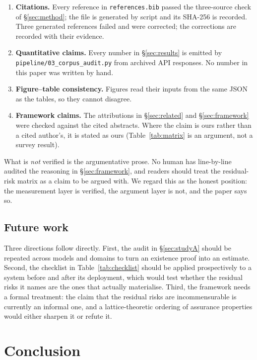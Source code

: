 \documentclass[11pt,a4paper]{article}
\begin{document}
\begin{enumerate}[leftmargin=*,itemsep=2pt]
  \item \textbf{Citations.} Every reference in \texttt{references.bib} passed
  the three-source check of \S\ref{sec:method}; the file is generated by script
  and its SHA-256 is recorded. Three generated references failed and were
  corrected; the corrections are recorded with their evidence.
  \item \textbf{Quantitative claims.} Every number in \S\ref{sec:results} is
  emitted by \texttt{pipeline/03\_corpus\_audit.py} from archived API responses.
  No number in this paper was written by hand.
  \item \textbf{Figure--table consistency.} Figures read their inputs from the
  same JSON as the tables, so they cannot disagree.
  \item \textbf{Framework claims.} The attributions in \S\ref{sec:related} and
  \S\ref{sec:framework} were checked against the cited abstracts. Where the
  claim is ours rather than a cited author's, it is stated as ours
  (Table~\ref{tab:matrix} is an argument, not a survey result).
\end{enumerate}

What is \emph{not} verified is the argumentative prose. No human has
line-by-line audited the reasoning in \S\ref{sec:framework}, and readers should
treat the residual-risk matrix as a claim to be argued with. We regard this as
the honest position: the measurement layer is verified, the argument layer is
not, and the paper says so.

\subsection{Future work}

Three directions follow directly. First, the audit in \S\ref{sec:studyA}
should be repeated across models and domains to turn an existence proof into
an estimate. Second, the checklist in Table~\ref{tab:checklist} should be
applied prospectively to a system before and after its deployment, which would
test whether the residual risks it names are the ones that actually materialise.
Third, the framework needs a formal treatment: the claim that the residual
risks are incommensurable is currently an informal one, and a lattice-theoretic
ordering of assurance properties would either sharpen it or refute it.

\section{Conclusion}
\end{document}
